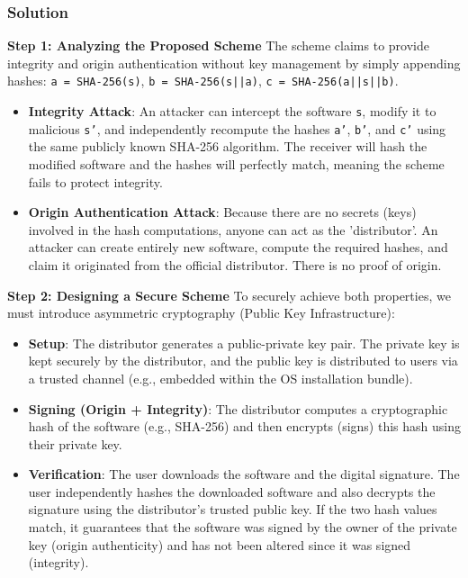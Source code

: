 \documentclass{article}
\begin{document}
\subsubsection*{Solution}
\textbf{Step 1: Analyzing the Proposed Scheme}
The scheme claims to provide integrity and origin authentication without key management by simply appending hashes: \texttt{a = SHA-256(s)}, \texttt{b = SHA-256(s||a)}, \texttt{c = SHA-256(a||s||b)}.
\begin{itemize}
    \item \textbf{Integrity Attack}: An attacker can intercept the software \texttt{s}, modify it to malicious \texttt{s'}, and independently recompute the hashes \texttt{a'}, \texttt{b'}, and \texttt{c'} using the same publicly known SHA-256 algorithm. The receiver will hash the modified software and the hashes will perfectly match, meaning the scheme fails to protect integrity.
    \item \textbf{Origin Authentication Attack}: Because there are no secrets (keys) involved in the hash computations, anyone can act as the 'distributor'. An attacker can create entirely new software, compute the required hashes, and claim it originated from the official distributor. There is no proof of origin.

\end{itemize}
\textbf{Step 2: Designing a Secure Scheme}
To securely achieve both properties, we must introduce asymmetric cryptography (Public Key Infrastructure):
\begin{itemize}
    \item[\textbf{1.}] \textbf{Setup}: The distributor generates a public-private key pair. The private key is kept securely by the distributor, and the public key is distributed to users via a trusted channel (e.g., embedded within the OS installation bundle).
    \item[\textbf{2.}] \textbf{Signing (Origin + Integrity)}: The distributor computes a cryptographic hash of the software (e.g., SHA-256) and then encrypts (signs) this hash using their private key.
    \item[\textbf{3.}] \textbf{Verification}: The user downloads the software and the digital signature. The user independently hashes the downloaded software and also decrypts the signature using the distributor's trusted public key. If the two hash values match, it guarantees that the software was signed by the owner of the private key (origin authenticity) and has not been altered since it was signed (integrity).
\end{itemize}
\end{document}
